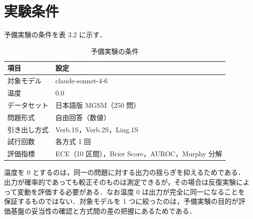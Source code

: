 \section{実験条件}

予備実験の条件を表 3.2 に示す．

\begin{table}[htbp]
\centering
\small
\caption{予備実験の条件}
\label{tab:3.2}
\begin{tabularx}{\linewidth}{|l|X|}
\hline
項目 & 設定 \\
\hline
対象モデル & claude-sonnet-4-6 \\
温度 & 0.0 \\
データセット & 日本語版 MGSM（250 問） \\
問題形式 & 自由回答（数値） \\
引き出し方式 & Verb.1S，Verb.2S，Ling.1S \\
試行回数 & 各方式 1 回 \\
評価指標 & ECE（10 区間），Brier Score，AUROC，Murphy 分解 \\
\hline
\end{tabularx}
\end{table}

温度を 0 とするのは，同一の問題に対する出力の揺らぎを抑えるためである．出力が確率的であっても較正そのものは測定できるが，その場合は反復実験によって変動を評価する必要がある．なお温度 0 は出力が完全に同一になることを保証するものではない．対象モデルを 1 つに絞ったのは，予備実験の目的が評価基盤の妥当性の確認と方式間の差の把握にあるためである．
